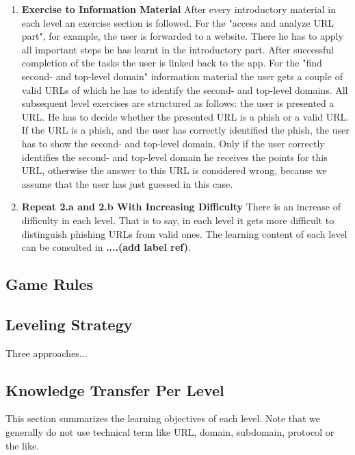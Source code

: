 \begin{enumerate}
\begin{enumerate}
		\item \textbf{Exercise to Information Material} After every introductory material in each level an exercise section is followed. For the "access and analyze URL part", for example, the user is forwarded to a website. There he has to apply all important steps he has learnt in the introductory part. After successful completion of the tasks the user is linked back to the app. For the "find second- and top-level domain" information material the user gets a couple of valid URLs of which he has to identify the second- and top-level domains. All subsequent level exercises are structured as follows: the user is presented a URL. He has to decide whether the presented URL is a phish or a valid URL. If the URL is a phish, and the user has correctly identified the phish, the user has to show the second- and top-level domain. Only if the user correctly identifies the second- and top-level domain he receives the points for this URL, otherwise the answer to this URL is considered wrong, because we assume that the user has just guessed in this case.
		\item \textbf{Repeat 2.a and 2.b With Increasing Difficulty} There is an increase of difficulty in each level. That is to say, in each level it gets more difficult to distinguish phishing URLs from valid ones. The learning content of each level can be consulted in \textbf{....(add label ref)}.
	\end{enumerate}
\end{enumerate}

\subsection{Game Rules}

\subsection{Leveling Strategy}
Three approaches...

\subsection{Knowledge Transfer Per Level}
This section summarizes the learning objectives of each level. Note that we generally do not use technical term like URL, domain, subdomain, protocol or the like.

